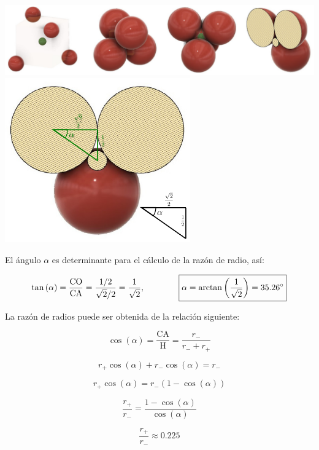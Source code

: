\vspace{-0.4cm}

\begin{center}
    \includegraphics{media/3dmodel.png}
    \includegraphics[width=8cm]{media/ang.png}
\end{center}

El ángulo $\alpha$ es determinante para el cálculo de la razón de radio, así:

$$\tan \left(\alpha\right) = \frac{\text{CO}}{\text{CA}} = \frac{1/2}{\sqrt{2}/2} = \frac{1}{\sqrt{2}}, \qquad \qquad \boxed{\alpha = \arctan\left( \frac{1}{\sqrt{2}} \right) = 35.26 \degree}$$

La razón de radios puede ser obtenida de la relación siguiente:

$$\cos \left(\alpha\right) = \frac{\text{CA}}{\text{H}} = \frac{r_-}{r_- + r_+}$$

$$r_+ \cos \left(\alpha\right) + r_- \cos \left(\alpha\right) = r_-$$

$$r_+ \cos \left(\alpha\right) = r_- \left(1 - \cos \left(\alpha\right)\right)$$

$$\frac{r_+}{r_-} = \frac{1 - \cos \left(\alpha\right)}{\cos \left(\alpha\right)}$$

$$\boxed{\frac{r_+}{r_-} \approx 0.225}$$